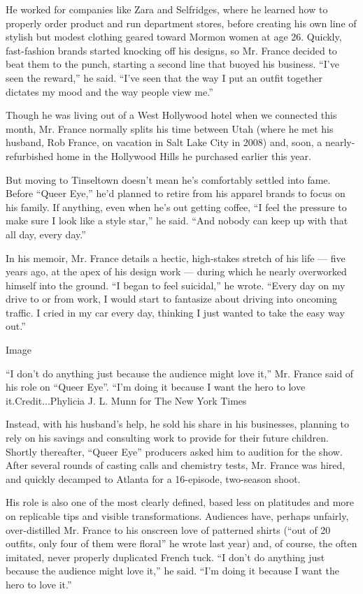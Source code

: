 He worked for companies like Zara and Selfridges, where he learned how
to properly order product and run department stores, before creating his
own line of stylish but modest clothing geared toward Mormon women at
age 26. Quickly, fast-fashion brands started knocking off his designs,
so Mr. France decided to beat them to the punch, starting a second line
that buoyed his business. ``I've seen the reward,'' he said. ``I've seen
that the way I put an outfit together dictates my mood and the way
people view me.''

Though he was living out of a West Hollywood hotel when we connected
this month, Mr. France normally splits his time between Utah (where he
met his husband, Rob France, on vacation in Salt Lake City in 2008) and,
soon, a nearly-refurbished home in the Hollywood Hills he purchased
earlier this year.

But moving to Tinseltown doesn't mean he's comfortably settled into
fame. Before ``Queer Eye,'' he'd planned to retire from his apparel
brands to focus on his family. If anything, even when he's out getting
coffee, ``I feel the pressure to make sure I look like a style star,''
he said. ``And nobody can keep up with that all day, every day.''

In his memoir, Mr. France details a hectic, high-stakes stretch of his
life --- five years ago, at the apex of his design work --- during which
he nearly overworked himself into the ground. ``I began to feel
suicidal,'' he wrote. ``Every day on my drive to or from work, I would
start to fantasize about driving into oncoming traffic. I cried in my
car every day, thinking I just wanted to take the easy way out.''

Image

``I don't do anything just because the audience might love it,'' Mr.
France said of his role on ``Queer Eye''. ``I'm doing it because I want
the hero to love it.Credit...Phylicia J. L. Munn for The New York Times

Instead, with his husband's help, he sold his share in his businesses,
planning to rely on his savings and consulting work to provide for their
future children. Shortly thereafter, ``Queer Eye'' producers asked him
to audition for the show. After several rounds of casting calls and
chemistry tests, Mr. France was hired, and quickly decamped to Atlanta
for a 16-episode, two-season shoot.

His role is also one of the most clearly defined, based less on
platitudes and more on replicable tips and visible transformations.
Audiences have, perhaps unfairly, over-distilled Mr. France to his
onscreen love of patterned shirts (``out of 20 outfits, only four of
them were floral'' he wrote last year) and, of course, the often
imitated, never properly duplicated French tuck. ``I don't do anything
just because the audience might love it,'' he said. ``I'm doing it
because I want the hero to love it.''

